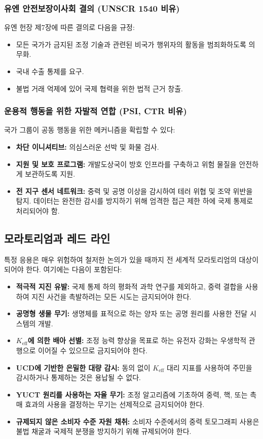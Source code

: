 \documentclass[12pt,a4paper]{article}
\theoremstyle{remark}
\newcommand{\Keff}{K_{\mathrm{eff}}}
\begin{document}
	\subsubsection{유엔 안전보장이사회 결의 (UNSCR 1540 비유)}
	
	유엔 헌장 제7장에 따른 결의로 다음을 규정:
	\begin{itemize}
		\item 모든 국가가 금지된 조정 기술과 관련된 비국가 행위자의 활동을 범죄화하도록 의무화.
		\item 국내 수출 통제를 요구.
		\item 불법 거래 억제에 있어 국제 협력을 위한 법적 근거 창출.
	\end{itemize}
	
	\subsubsection{운용적 행동을 위한 자발적 연합 (PSI, CTR 비유)}
	
	국가 그룹이 공동 행동을 위한 메커니즘을 확립할 수 있다:
	\begin{itemize}
		\item \textbf{차단 이니셔티브:} 의심스러운 선박 및 화물 검사.
		\item \textbf{지원 및 보호 프로그램:} 개발도상국이 방호 인프라를 구축하고 위험 물질을 안전하게 보관하도록 지원.
		\item \textbf{전 지구 센서 네트워크:} 중력 및 공명 이상을 감시하여 테러 위협 및 조약 위반을 탐지. 데이터는 완전한 감시를 방지하기 위해 엄격한 접근 제한 하에 국제 통제로 처리되어야 함.
	\end{itemize}
	
	\subsection{모라토리엄과 레드 라인}
	\label{subsec:redlines}
	
	특정 응용은 매우 위험하여 철저한 논의가 있을 때까지 전 세계적 모라토리엄의 대상이 되어야 한다. 여기에는 다음이 포함된다:
	\begin{itemize}[leftmargin=*]
		\item \textbf{적극적 지진 유발:} 국제 통제 하의 평화적 과학 연구를 제외하고, 중력 결합을 사용하여 지진 사건을 촉발하려는 모든 시도는 금지되어야 한다.
		\item \textbf{공명형 생물 무기:} 생명체를 표적으로 하는 양자 또는 공명 원리를 사용한 전달 시스템의 개발.
		\item \textbf{\(\Keff\)에 의한 배아 선별:} 조정 능력 향상을 목표로 하는 유전자 강화는 우생학적 관행으로 이어질 수 있으므로 금지되어야 한다.
		\item \textbf{UCD에 기반한 은밀한 대량 감시:} 동의 없이 \(\Keff\) 대리 지표를 사용하여 주민을 감시하거나 통제하는 것은 용납될 수 없다.
		\item \textbf{YUCT 원리를 사용하는 자율 무기:} 조정 알고리즘에 기초하여 중력, 핵, 또는 촉매 효과의 사용을 결정하는 무기는 선제적으로 금지되어야 한다.
		\item \textbf{규제되지 않은 소비자 수준 자원 채취:} 소비자 수준에서의 중력 토모그래피 사용은 불법 채굴과 국제적 분쟁을 방지하기 위해 규제되어야 한다.
	\end{itemize}
	
\end{document}
